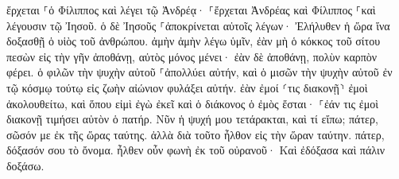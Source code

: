 \documentclass{openreader}
\begin{document}
ἔρχεται ⸀ὁ Φίλιππος καὶ λέγει τῷ Ἀνδρέᾳ· ⸀ἔρχεται Ἀνδρέας καὶ Φίλιππος ⸀καὶ λέγουσιν τῷ Ἰησοῦ. 
ὁ δὲ Ἰησοῦς ⸀ἀποκρίνεται αὐτοῖς λέγων· Ἐλήλυθεν ἡ ὥρα ἵνα δοξασθῇ ὁ υἱὸς τοῦ ἀνθρώπου. 
ἀμὴν ἀμὴν λέγω ὑμῖν, ἐὰν μὴ ὁ κόκκος τοῦ σίτου πεσὼν εἰς τὴν γῆν ἀποθάνῃ, αὐτὸς μόνος μένει· ἐὰν δὲ ἀποθάνῃ, πολὺν καρπὸν φέρει. 
ὁ φιλῶν τὴν ψυχὴν αὐτοῦ ⸀ἀπολλύει αὐτήν, καὶ ὁ μισῶν τὴν ψυχὴν αὐτοῦ ἐν τῷ κόσμῳ τούτῳ εἰς ζωὴν αἰώνιον φυλάξει αὐτήν. 
ἐὰν ἐμοί ⸂τις διακονῇ⸃ ἐμοὶ ἀκολουθείτω, καὶ ὅπου εἰμὶ ἐγὼ ἐκεῖ καὶ ὁ διάκονος ὁ ἐμὸς ἔσται· ⸀ἐάν τις ἐμοὶ διακονῇ τιμήσει αὐτὸν ὁ πατήρ. 
Νῦν ἡ ψυχή μου τετάρακται, καὶ τί εἴπω; πάτερ, σῶσόν με ἐκ τῆς ὥρας ταύτης. ἀλλὰ διὰ τοῦτο ἦλθον εἰς τὴν ὥραν ταύτην. 
πάτερ, δόξασόν σου τὸ ὄνομα. ἦλθεν οὖν φωνὴ ἐκ τοῦ οὐρανοῦ· Καὶ ἐδόξασα καὶ πάλιν δοξάσω. 
\end{document}
